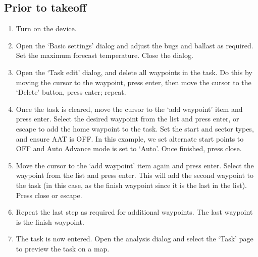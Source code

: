 \documentclass[a4paper,12pt]{refrep}
\begin{document}
\subsection*{Prior to takeoff}
\begin{enumerate}
\item Turn on the device.
\item Open the `Basic settings' dialog and adjust the bugs and ballast as required.  Set the maximum forecast temperature.  Close the dialog.
\item Open the `Task edit' dialog, and delete all waypoints in the task.  Do this by moving the cursor to the waypoint, press enter, then move the cursor to the `Delete' button, press enter; repeat.
\item Once the task is cleared, move the cursor to the `add waypoint' item and press enter.  Select the desired waypoint from the list and press enter, or escape to add the home waypoint to the task.  Set the start and sector types, and ensure AAT is OFF.  In this example, we set alternate start points to OFF and Auto Advance mode is set to `Auto'.  Once finished, press close.
\item Move the cursor to the `add waypoint' item again and press enter.  Select the waypoint from the list and press enter.  This will add the second waypoint to the task (in this case, as the finish waypoint since it is the last in the list).  Press close or escape.
\item Repeat the last step as required for additional waypoints.  The last waypoint is the finish waypoint.
\item The task is now entered.  Open the analysis dialog and select the `Task' page to preview the task on a map.
\end{enumerate}
\end{document}
